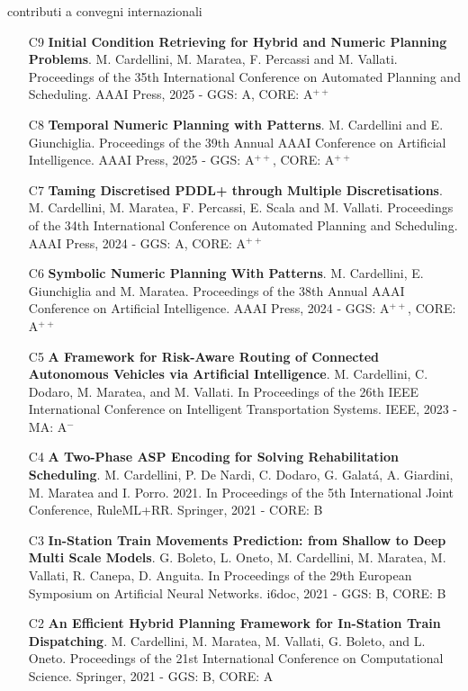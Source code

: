 \documentclass{resume} %
\begin{document}
\begin{rSection}{contributi a convegni internazionali}
\begin{enumerate}[leftmargin=5mm]
	\item[C9] \textbf{Initial Condition Retrieving for Hybrid and Numeric Planning Problems}. M. Cardellini, M. Maratea, F. Percassi and M. Vallati. Proceedings of the 35th International Conference on Automated Planning and Scheduling. AAAI Press, 2025 - GGS: A, CORE: A$^{++}$
	
	
	\item[C8] \textbf{Temporal Numeric Planning with Patterns}. M. Cardellini and E. Giunchiglia. Proceedings of the 39th Annual AAAI Conference on Artificial Intelligence. AAAI Press, 2025 - GGS: A$^{++}$, CORE: A$^{++}$
	
	\item[C7] \textbf{Taming Discretised PDDL+ through Multiple Discretisations}. M. Cardellini, M. Maratea, F. Percassi, E. Scala and M. Vallati. Proceedings of the 34th International Conference on Automated Planning and Scheduling. AAAI Press, 2024 - GGS: A, CORE: A$^{++}$
	
	\item[C6] \textbf{Symbolic Numeric Planning With Patterns}. M. Cardellini, E. Giunchiglia and M. Maratea. Proceedings of the 38th Annual AAAI Conference on Artificial Intelligence. AAAI Press, 2024 - GGS: A$^{++}$, CORE: A$^{++}$
	
	\item[C5] \textbf{A Framework for Risk-Aware Routing of Connected Autonomous Vehicles via Artificial Intelligence}. M. Cardellini, C. Dodaro, M. Maratea, and M. Vallati. In Proceedings of the 26th IEEE International Conference on Intelligent Transportation Systems. IEEE, 2023 - MA: A$^-$
	
	\item[C4] \textbf{A Two-Phase ASP Encoding for Solving Rehabilitation Scheduling}. M. Cardellini, P. De Nardi, C. Dodaro, G. Galat\'a, A. Giardini, M. Maratea and I. Porro. 2021. In Proceedings of the 5th International Joint Conference, RuleML+RR. Springer, 2021 - CORE: B
	
	
	\item[C3] \textbf{In-Station Train Movements Prediction: from Shallow to Deep Multi Scale Models}. G. Boleto, L. Oneto, M. Cardellini, M. Maratea, M. Vallati, R. Canepa, D. Anguita. In Proceedings of the 29th European Symposium on Artificial Neural Networks. i6doc, 2021 - GGS: B, CORE: B
	
	\item[C2] \textbf{An Efficient Hybrid Planning Framework for In-Station Train Dispatching}. M. Cardellini, M. Maratea, M. Vallati, G. Boleto, and L. Oneto. Proceedings of the 21st International Conference on Computational Science. Springer, 2021 - GGS: B, CORE: A
	

\end{enumerate}
\end{rSection}
\end{document}
